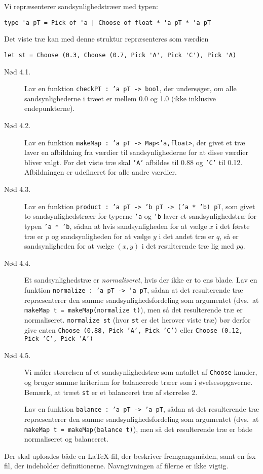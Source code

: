 \documentclass[a4paper]{article}
\begin{document}
Vi repræsenterer sandsynlighedstræer med typen:

\begin{verbatim}
type 'a pT = Pick of 'a | Choose of float * 'a pT * 'a pT
\end{verbatim}

\noindent
Det viste træ kan med denne struktur repræsenteres som værdien

\begin{verbatim}
let st = Choose (0.3, Choose (0.7, Pick 'A', Pick 'C'), Pick 'A)
\end{verbatim}

\begin{description}

\item[Nød 4.1.] Lav en funktion \texttt{checkPT : 'a pT -> bool}, der
  undersøger, om alle sandsynlighederne i træet er mellem 0.0 og 1.0
  (ikke inklusive endepunkterne).

\item[Nød 4.2.] Lav en funktion \texttt{makeMap : 'a pT ->
  Map<'a,float>}, der givet et træ laver en afbildning fra værdier til
  sandsynlighederne for at disse værdier bliver valgt.  For det viste
  træ skal \texttt{'A'} afbildes til 0.88 og \texttt{'C'} til 0.12.
  Afbildningen er udefineret for alle andre værdier.

\item[Nød 4.3.] Lav en funktion \texttt{product : 'a pT -> 'b pT ->
  ('a * 'b) pT}, som givet to sandsynlighedstræer for typerne
  \texttt{'a} og \texttt{'b} laver et sandsynlighedstræ for typen
  \texttt{'a * 'b}, sådan at hvis sandsynligheden for at vælge $x$ i
  det første træ er $p$ og sandsynligheden for at vælge $y$ i det
  andet træ er $q$, så er sandsynligheden for at vælge $(x,y)$ i det
  resulterende træ lig med $pq$.

\item[Nød 4.4.] Et sandsynlighedstræ er \emph{normaliseret}, hvis der
  ikke er to ens blade.  Lav en funktion \texttt{normalize : 'a pT ->
    'a pT}, sådan at det resulterende træ repræsenterer den samme
  sandsynlighedsfordeling som argumentet (dvs.\ at \texttt{makeMap t =
    makeMap(normalize t)}), men så det resulterende træ er
  normaliseret.  \texttt{normalize st} (hvor \texttt{st} er det
  herover viste træ) bør derfor give enten \texttt{Choose (0.88, Pick
    'A', Pick 'C')} eller \texttt{Choose (0.12, Pick 'C', Pick 'A')}


\item[Nød 4.5.] Vi måler størrelsen af et sandsynlighedstræ som
  antallet af \texttt{Choose}-knuder, og bruger samme kriterium for
  balancerede træer som i øvelsesopgaverne.  Bemærk, at
  træet \texttt{st} er et balanceret træ af størrelse 2.

  Lav en funktion \texttt{balance : 'a pT -> 'a pT}, sådan at det
  resulterende træ repræsenterer den samme sandsynlighedsfordeling som
  argumentet (dvs.\ at \texttt{makeMap t = makeMap(balance t)}), men
  så det resulterende træ er både normaliseret og balanceret.

\end{description}

\noindent
Der skal uploades både en \LaTeX-fil, der beskriver fremgangsmåden,
samt en fsx fil, der indeholder definitionerne.  Navngivningen af
filerne er ikke vigtig.
\end{document}

